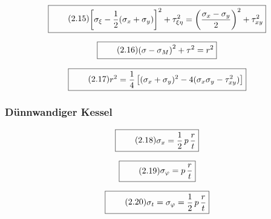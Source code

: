 \documentclass[11pt]{article}
\newcommand{\1}{ {\mathds{1}} }
\begin{document}
\begin{multicols}{2}
		\begin{equation}
			\boxed{
				\tag{2.15}
				\begin{split}
					\left[\sigma_\xi - \frac{1}{2} (\sigma_x + \sigma_y)\right]^2
					+
					\tau_{\xi \eta}^2
					=
					\left(
						\frac{\sigma_x - \sigma_y}{2}
					\right)^2
					+
					\tau_{xy}^2
				\end{split}
			}
		\end{equation}		

		\begin{equation}
			\boxed{
				\tag{2.16}
				\begin{split}
					\left(\sigma - \sigma_M\right)^2
					+
					\tau^2
					=
					r^2
				\end{split}
			}
		\end{equation}		

		\begin{equation}
			\boxed{
				\tag{2.17}
				\begin{split}
					r^2
					=
					\frac{1}{4}
					\left[
						(\sigma_x + \sigma_y)^2
						-
						4 (\sigma_x\sigma_y -\tau_{xy}^2)
					\right]
				\end{split}
			}
		\end{equation}		

		\subsubsection{Dünnwandiger Kessel}

		\begin{equation}
			\boxed{
				\tag{2.18}
				\begin{split}
					\sigma_x
					=
					\frac{1}{2} \,p\, \frac{r}{t}
				\end{split}
			}
		\end{equation}

		\begin{equation}
			\boxed{
				\tag{2.19}
				\begin{split}
					\sigma_{\varphi}
					=
					p\,
					\frac{r}{t}
				\end{split}
			}
		\end{equation}

		\begin{equation}
			\boxed{
				\tag{2.20}
				\begin{split}
					\sigma_t
					=
					\sigma_\varphi
					=
					\frac{1}{2}\,p\,\frac{r}{t}
				\end{split}
			}
		\end{equation}


\end{multicols}
\end{document}
